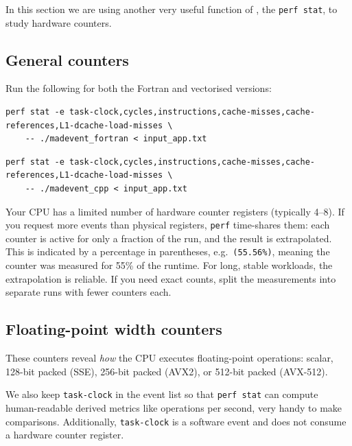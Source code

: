 \documentclass[11pt,a4paper]{article}
\begin{document}
In this section we are using another very useful function of \perf, the \texttt{perf stat}, to study hardware counters.

\subsection{General counters}

Run the following for both the Fortran and vectorised versions:

\begin{lstlisting}[style=bashstyle]
perf stat -e task-clock,cycles,instructions,cache-misses,cache-references,L1-dcache-load-misses \
    -- ./madevent_fortran < input_app.txt
\end{lstlisting}

\begin{lstlisting}[style=bashstyle]
perf stat -e task-clock,cycles,instructions,cache-misses,cache-references,L1-dcache-load-misses \
    -- ./madevent_cpp < input_app.txt
\end{lstlisting}

\begin{tipbox}
Your CPU has a limited number of hardware counter registers (typically 4--8).
If you request more events than physical registers, \texttt{perf} time-shares them: each counter is active for only a fraction of the run, and the result is extrapolated.
This is indicated by a percentage in parentheses, e.g.\ \texttt{(55.56\%)}, meaning the counter was measured for 55\% of the runtime.
For long, stable workloads, the extrapolation is reliable.
If you need exact counts, split the measurements into separate runs with fewer counters each.
\end{tipbox}

\subsection{Floating-point width counters}

These counters reveal \emph{how} the CPU executes floating-point operations: scalar, 128-bit packed (SSE), 256-bit packed (AVX2), or 512-bit packed (AVX-512).

We also keep \texttt{task-clock} in the event list so that \texttt{perf stat} can compute human-readable derived metrics like operations per second, very handy to make comparisons.
Additionally, \texttt{task-clock} is a software event and does not consume a hardware counter register.
\end{document}
